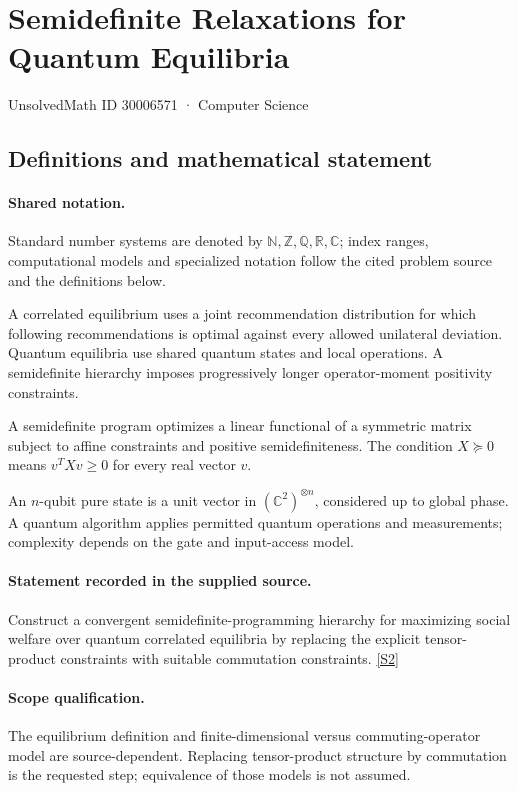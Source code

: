 \documentclass[11pt]{article}
\newcommand{\sref}[2]{\hyperlink{source:#1:#2}{[S#2]}}
\begin{document}
\setcounter{section}{30006570}
\section{Semidefinite Relaxations for Quantum Equilibria}\label{30006571}
{\small\sffamily UnsolvedMath ID 30006571 · Computer Science}
\subsection{Definitions and mathematical statement}

\paragraph{Shared notation.}Standard number systems are denoted by $\mathbb N,\mathbb Z,\mathbb Q,\mathbb R,\mathbb C$; index ranges, computational models and specialized notation follow the cited problem source and the definitions below.


A correlated equilibrium uses a joint recommendation distribution for which following recommendations is optimal against every allowed unilateral deviation. Quantum equilibria use shared quantum states and local operations. A semidefinite hierarchy imposes progressively longer operator-moment positivity constraints.

A semidefinite program optimizes a linear functional of a symmetric matrix subject to affine constraints and positive semidefiniteness. The condition $X\succeq0$ means $v^TXv\geq0$ for every real vector $v$.

An $n$-qubit pure state is a unit vector in $(\mathbb C^2)^{\otimes n}$, considered up to global phase. A quantum algorithm applies permitted quantum operations and measurements; complexity depends on the gate and input-access model.
\paragraph{Statement recorded in the supplied source.}
Construct a convergent semidefinite-programming hierarchy for maximizing social welfare over quantum correlated equilibria by replacing the explicit tensor-product constraints with suitable commutation constraints. \sref{30006571}{2}
\paragraph{Scope qualification.}
The equilibrium definition and finite-dimensional versus commuting-operator model are source-dependent. Replacing tensor-product structure by commutation is the requested step; equivalence of those models is not assumed.
\end{document}
